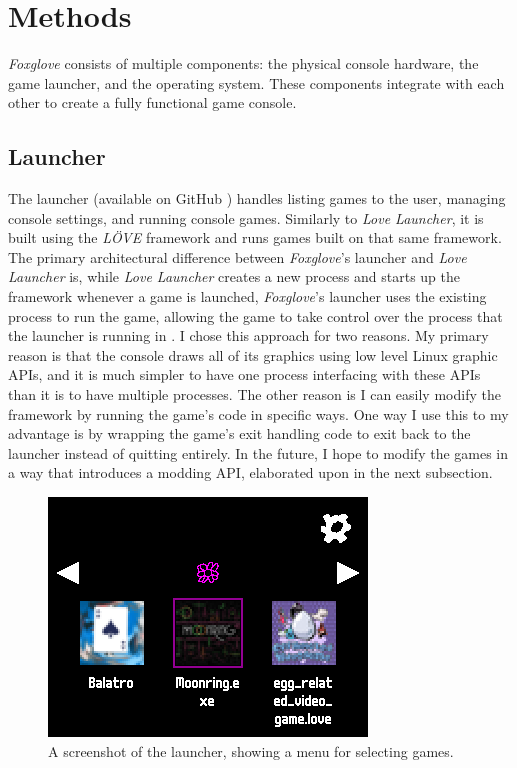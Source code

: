 \documentclass[10pt,twocolumn]{article}
\begin{document}
\section{Methods}

\textit{Foxglove} consists of multiple components:
the physical console hardware, the
game launcher, and the operating system. These components integrate with each
other to create a fully functional game console.

\subsection{Launcher}

The launcher (available on GitHub
\cite{perry_lavenderperryfoxglove-launcher_2025})
handles listing games to the user, managing console settings, and
running console games. Similarly to \textit{Love Launcher},
it is built using the \textit{LÖVE}
framework and runs games built on that same framework. The primary architectural
difference between \textit{Foxglove}'s launcher and
\textit{Love Launcher} is, while \textit{Love Launcher}
creates a new process and starts up the framework whenever a game is launched,
\textit{Foxglove}'s launcher uses the existing process to run the game,
allowing the game
to take control over the process that the launcher is running in
\cite{noauthor_glitchapplovelauncher_nodate}. I chose this approach for two
reasons. My primary reason is that the console draws all of its graphics using
low level Linux graphic APIs, and it is much simpler to have one process
interfacing with these APIs than it is to have multiple processes. The other
reason is I can easily modify the framework by running the game's code in
specific ways. One way I use this to my advantage is by wrapping the game's exit
handling code to exit back to the launcher instead of quitting entirely. In the
future, I hope to modify the games in a way that introduces a modding API,
elaborated upon in the next subsection.

\begin{figure}[!htb]
    \centering
    \includegraphics[width=.95\linewidth]{launcher.png}
    \caption{
        A screenshot of the launcher, showing a menu for selecting games.
    }
    \label{fig:launcher}
\end{figure}
\end{document}
